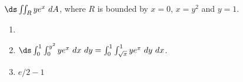 {$\ds \iint_R ye^x\ dA$, where $R$ is bounded by $x=0$, $x=y^2$ and $y=1$. 
}
{\begin{enumerate}
\item \noindent \begin{minipage}{.9\linewidth}
\end{minipage}
\item	$\ds \int_{0}^1\int_{0}^{y^2}ye^x\ dx\ dy = \int_{0}^1\int_{\sqrt{x}}^{1}ye^x\ dy\ dx$.
\item $e/2-1$
\end{enumerate}
}